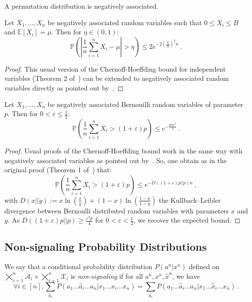 \begin{proposition}
  \label{prop:permNA}
   A permutation distribution is negatively associated.
\end{proposition} 

\begin{proposition}
  \label{prop:chernoff1}
  Let $X_1, \ldots, X_n$ be negatively associated random variables such that $0 \leq X_i \leq B$ and $\mathbb{E}[X_i] = \mu$. Then for $\eta \in (0,1)$:
  \[ \mathbb{P}\left(\left|\frac{1}{n}\sum_{i=1}^n X_i - \mu\right| > \eta \right) \leq 2e^{-2\left(\frac{\eta}{B}\right)^2n} \ . \]
\end{proposition}
\begin{proof}
This usual version of the Chernoff-Hoeffding bound for independent variables (Theorem 2 of~\cite{Hoeffding63}) can be extended to negatively associated random variables directly as pointed out by~\cite{DR98}.
\end{proof}

\begin{proposition}
  \label{prop:chernoff2}
  Let $X_1, \ldots, X_n$ be negatively associated Bernouilli random variables of parameter $p$. Then for $0 < \varepsilon \leq \frac{1}{2}$:
  \[ \mathbb{P}\left(\frac{1}{n}\sum_{i=1}^n X_i > (1+\varepsilon)p \right) \leq e^{-\frac{pn\varepsilon^2}{4}} \ . \]
\end{proposition}
\begin{proof}
  Usual proofs of the Chernoff-Hoeffding bound work in the same way with negatively associated variables as pointed out by~\cite{DR98}. So, one obtain as in the original proof (Theorem 1 of~\cite{Hoeffding63}) that:
  \[ \mathbb{P}\left(\frac{1}{n}\sum_{i=1}^n X_i > (1+\varepsilon)p \right) \leq e^{-D\left((1+\varepsilon)p||p\right)n} \ ,\]
    with $D\left(x||y\right) := x\ln\left(\frac{x}{y}\right) + (1-x)\ln\left(\frac{1-x}{1-y}\right)$ the Kullback–Leibler divergence between Bernoulli distributed random variables with parameters $x$ and $y$. As $D\left((1+\varepsilon)p||p\right) \geq \frac{\varepsilon^2p}{4}$ for $0 < \varepsilon < \frac{1}{2}$, we recover the expected bound.
\end{proof}

\subsection{Non-signaling Probability Distributions}
\begin{definition}
  \label{defi:nonsignaling}
  We say that a conditional probability distribution $P(a^n|x^n)$ defined on $\bigtimes_{i=1}^n\mathcal{A}_i \times \bigtimes_{i=1}^n \mathcal{X}_i$ is \emph{non-signaling} if for all $a^n, x^n, \hat{x}^n$, we have
    \[ \forall i \in [n], \sum_{\hat{a}_i}P(a_1\ldots \hat{a}_i \ldots a_n|x_1\ldots x_i \ldots x_n) = \sum_{\hat{a}_i}P(a_1\ldots \hat{a}_i \ldots a_n|x_1\ldots \hat{x}_i \ldots x_n) \ .\]
\end{definition}


